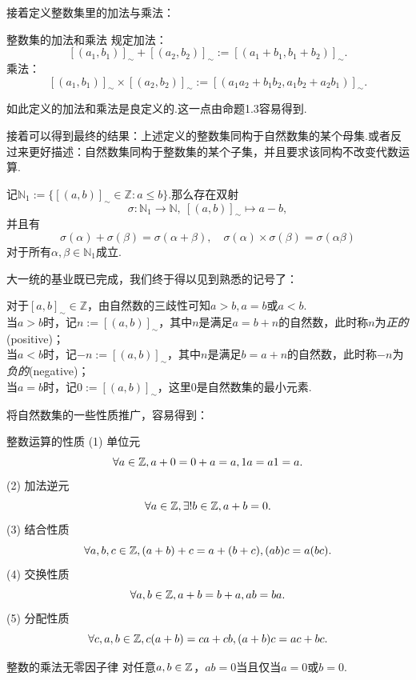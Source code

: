 接着定义整数集里的加法与乘法：

\begin{definition}{整数集的加法和乘法}
	规定加法：$$[(a_1,b_1)]_{\sim} + [(a_2,b_2)]_{\sim} := [(a_1+b_1,b_1+b_2)]_{\sim}.$$
	乘法：
	$$[(a_1,b_1)]_{\sim} \times [(a_2,b_2)]_{\sim} := [(a_1a_2+b_1b_2,a_1b_2+a_2b_1)]_{\sim}.$$
\end{definition}

如此定义的加法和乘法是良定义的.这一点由命题1.3容易得到.

接着可以得到最终的结果：上述定义的整数集同构于自然数集的某个母集.或者反过来更好描述：自然数集同构于整数集的某个子集，并且要求该同构不改变代数运算.

\begin{proposition}
	记$\mathbb{N}_1:=\{ [(a,b)]_{\sim} \in \mathbb{Z}:a \leq b \}$.那么存在双射$$\sigma :\mathbb{N}_1 \to \mathbb{N},~[(a,b)]_{\sim} \mapsto a-b,$$
	并且有$$\sigma (\alpha) + \sigma (\beta) = \sigma (\alpha + \beta),\quad \sigma (\alpha) \times \sigma (\beta) = \sigma (\alpha  \beta)$$
	对于所有$\alpha ,\beta \in \mathbb{N}_1$成立.
\end{proposition}

大一统的基业既已完成，我们终于得以见到熟悉的记号了：

\begin{definition}
	对于$[a,b]_{\sim} \in \mathbb{Z}$，由自然数的三歧性可知$a>b,a=b$或$a<b$. \\
	当$a>b$时，记$n:=[(a,b)]_{\sim}$，其中$n$是满足$a=b+n$的自然数，此时称$n$为\textit{正的}(positive)； \\
	当$a<b$时，记$-n:=[(a,b)]_{\sim}$，其中$n$是满足$b=a+n$的自然数，此时称$-n$为\textit{负的}(negative)； \\
	当$a=b$时，记$0:=[(a,b)]_{\sim}$，这里$0$是自然数集的最小元素.
\end{definition}

将自然数集的一些性质推广，容易得到：

\begin{proposition}{整数运算的性质}
	(1) 单位元$$\forall a \in \mathbb{Z} , a + 0 = 0+ a = a , 1 a = a 1 = a .$$
	(2) 加法逆元$$\forall a \in \mathbb{Z} , \exists ! b \in \mathbb{Z} , a + b = 0 .$$
	(3) 结合性质$$\forall a , b , c \in \mathbb{Z} , (a + b) + c = a + (b + c) , (a b) c = a (b c) .$$
	(4) 交换性质$$\forall a , b \in \mathbb{Z} , a + b = b + a , a b = b a .$$
	(5) 分配性质$$\forall c , a , b \in \mathbb{Z} , c (a + b) = c a + c b,(a+b)c=ac+bc .$$
\end{proposition}

\begin{proposition}{整数的乘法无零因子律}
	对任意$a,b \in \mathbb{Z}$，$ab=0$当且仅当$a=0$或$b=0$.
\end{proposition}

